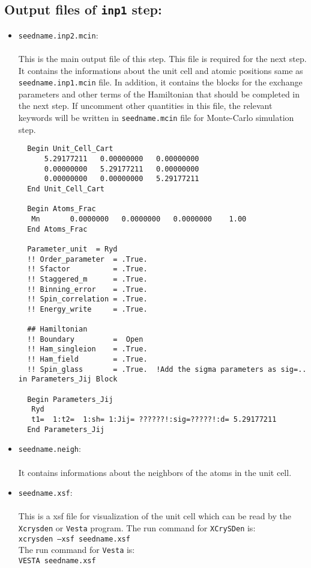 \documentclass[10pt]{report}
\begin{document}
\subsection{Output files of {\tt inp1} step:}
\begin{itemize} %
\item {\tt seedname.inp2.mcin}:\\\\
This is the main output file of this step. This file is required for the next step.
It contains the informations about the unit cell and atomic positions same as {\tt seedname.inp1.mcin} file.
In addition, it contains the blocks for the exchange parameters and other terms of the Hamiltonian that
should be completed in the next step. 
If uncomment other quantities in this file, the relevant keywords will be written in {\tt seedname.mcin} file for
Monte-Carlo simulation step.
{\scriptsize    
\begin{verbatim}
  Begin Unit_Cell_Cart
      5.29177211   0.00000000   0.00000000
      0.00000000   5.29177211   0.00000000
      0.00000000   0.00000000   5.29177211
  End Unit_Cell_Cart
  
  Begin Atoms_Frac
   Mn       0.0000000   0.0000000   0.0000000    1.00
  End Atoms_Frac
  
  Parameter_unit  = Ryd
  !! Order_parameter  = .True.
  !! Sfactor          = .True.
  !! Staggered_m      = .True.
  !! Binning_error    = .True.
  !! Spin_correlation = .True.
  !! Energy_write     = .True.

  ## Hamiltonian
  !! Boundary         =  Open
  !! Ham_singleion    = .True.
  !! Ham_field        = .True.
  !! Spin_glass       = .True.  !Add the sigma parameters as sig=.. in Parameters_Jij Block

  Begin Parameters_Jij
   Ryd
   t1=  1:t2=  1:sh= 1:Jij= ??????!:sig=?????!:d= 5.29177211
  End Parameters_Jij
\end{verbatim}
}
\item {\tt seedname.neigh}:\\\\
It contains informations about the neighbors of the atoms in the unit cell.
\item {\tt seedname.xsf}:\\\\
This is a xsf file for visualization of the unit cell which can be read by the {\tt Xcrysden} or {\tt Vesta} program.
The run command for {\tt XCrySDen} is:\\
{\tt xcrysden --xsf seedname.xsf} \\
The run command for {\tt Vesta} is:\\
{\tt VESTA seedname.xsf}

\end{itemize}
\end{document}
